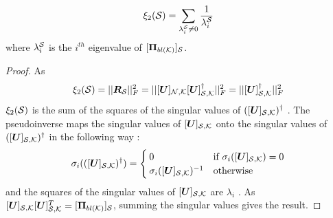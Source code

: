 \begin{lemma}
\label{lemma:simplify_xi_2}
\begin{equation}
    \xi_{2}(\mathcal{S}) = \sum_{\lambda_{i}^{\mathcal{S}} \neq 0} { \frac{1}{\lambda_{i}^{\mathcal{S}}}  }
\end{equation}
    where $\lambda_{i}^{\mathcal{S}}$ is the $i^{th}$ eigenvalue of $\projbl[S]$.
\end{lemma}
\begin{proof} As
\begin{align}
\xi_{2}(\set{S}) = ||\matr{R}_{\set{S}}||^{2}_{F}
= ||\matrsubU{N}[\matr{U}]_{\set{S},\set{K}}^{\dagger}||^{2}_{F} = ||[\matr{U}]_{\set{S},\set{K}}^{\dagger}||^{2}_{F} \label{eq:xi_2_is_U_pseudo_frob}
\end{align}
    $\xi_{2}(\mathcal{S})$ is the sum of the squares of the singular values of $([\bm{U}]_{\mathcal{S},\mathcal{K}})^{\dagger}$ \cite[Corollary 2.4.3]{golub13}. The pseudoinverse maps the singular values of $[\bm{U}]_{\mathcal{S},\mathcal{K}}$ onto the singular values of $([\bm{U}]_{\mathcal{S},\mathcal{K}})^{\dagger}$ in the following way \cite[Section 5.5.2]{golub13}:
    \begin{equation}
    \sigma_{i}(([\bm{U}]_{\mathcal{S},\mathcal{K}})^{\dagger}) =
        \begin{cases}
            0 &\textrm{if }\sigma_{i}([\bm{U}]_{\mathcal{S},\mathcal{K}}) = 0 \\
            \sigma_{i}([\bm{U}]_{\mathcal{S},\mathcal{K}})^{-1} &\textrm{otherwise}
        \end{cases}
    \end{equation}
    and the squares of the singular values of $[\bm{U}]_{\mathcal{S},\mathcal{K}}$ are $\lambda_{i}$ \cite[Eq. (8.6.1)]{golub13}. As $[\matr{U}]_{\set{S},\set{K}}[\matr{U}]_{\set{S},\set{K}}^{T} = \projbl[S]$, summing the singular values gives the result.
\end{proof}



